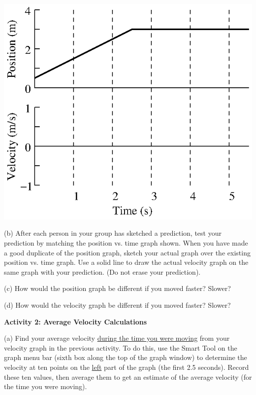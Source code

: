 \vspace{0.3cm}
{\par\centering \includegraphics{relating/relating_fig1.eps} \par}
\vspace{0.3cm}

(b) After each person in your group has sketched a prediction, test your prediction
by matching the position vs. time graph shown. When you have made a good duplicate
of the position graph, sketch your actual graph over the existing position vs.
time graph.
Use a solid line to draw the actual velocity graph on the same graph with
your prediction. (Do not erase your prediction).

(c) How would the position graph be different if you moved faster? Slower? 
\vspace{20mm}

(d) How would the velocity graph be different if you moved faster? Slower? 
\vspace{20mm}

\textbf{Activity 2: Average Velocity Calculations} 

(a) Find your average velocity \underline{during the time you were moving} from your velocity graph in the previous activity. To do this, use the Smart Tool on the graph menu bar (sixth box along the top of the graph window) to determine the velocity at ten points on the \underline{left} part of the graph (the first 2.5 seconds). Record these ten values, then average them to get an estimate of the average velocity (for the time you were moving).

